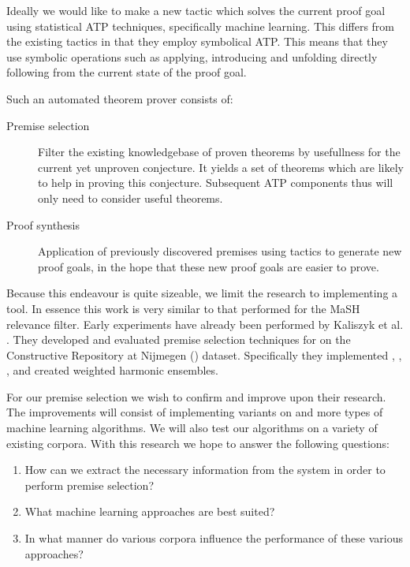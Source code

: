 Ideally we would like to make a new tactic which solves the current proof goal using statistical ATP techniques, specifically machine learning.
This differs from the existing tactics in that they employ symbolical ATP. This means that they use symbolic operations such as applying, introducing and unfolding
directly following from the current state of the proof goal. 

Such an automated theorem prover consists of:
\begin{description}
\item[Premise selection] Filter the existing knowledgebase of proven theorems by usefullness for the current yet unproven conjecture.
It yields a set of theorems which are likely to help in proving this conjecture.
Subsequent ATP components thus will only need to consider useful theorems. 
\item[Proof synthesis] Application of previously discovered premises using tactics to generate new proof goals,
in the hope that these new proof goals are easier to prove.
\end{description}

Because this endeavour is quite sizeable, we limit the research to implementing a \premiseselection tool.
In essence this work is very similar to that performed for the MaSH relevance filter.
Early experiments have already been performed by Kaliszyk et al. \cite{kaliszyk2014machine}.
They developed and evaluated premise selection techniques for \coq on the Constructive \coq Repository at Nijmegen (\corn) dataset.
Specifically they implemented \knn, \nb, \mepo, and created weighted harmonic ensembles.

For our premise selection we wish to confirm and improve upon their research.
The improvements will consist of implementing variants on and more types of machine learning algorithms.
We will also test our algorithms on a variety of existing \coq corpora.
With this research we hope to answer the following questions:
\begin{enumerate}
\item How can we extract the necessary information from the \coq system in order to perform premise selection?
\item What machine learning approaches are best suited?
\item In what manner do various corpora influence the performance of these various approaches?
\end{enumerate}

